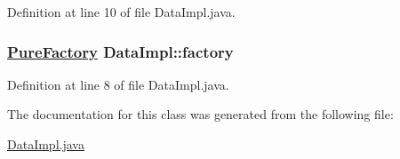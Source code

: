 Definition at line 10 of file Data\-Impl.java.\hypertarget{classDataImpl_o0}{
\subsubsection[factory]{\setlength{\rightskip}{0pt plus 5cm}\hyperlink{classPureFactory}{Pure\-Factory} Data\-Impl::factory}}
\label{classDataImpl_o0}




Definition at line 8 of file Data\-Impl.java.

The documentation for this class was generated from the following file:\begin{CompactItemize}
\item 
\hyperlink{DataImpl_8java-source}{Data\-Impl.java}\end{CompactItemize}
